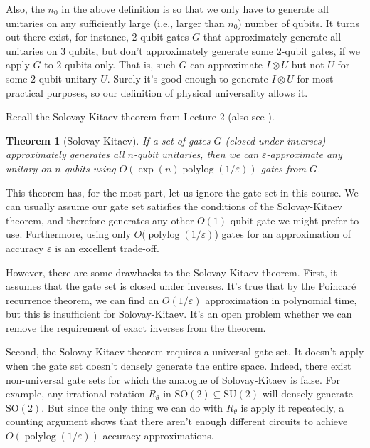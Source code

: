 \documentclass[11pt]{report}
\theoremstyle{plain}
\newtheorem{theorem}{Theorem}[section]
\theoremstyle{definition}
\newcommand{\eps}{\varepsilon}
\newcommand{\polylog}{\operatorname{polylog}}
\begin{document}
Also, the $n_0$ in the above definition is so that we only have to generate all unitaries on any sufficiently large (i.e., larger than $n_0$) number of qubits. It turns out there exist, for instance, $2$-qubit gates $G$ that approximately generate all unitaries on $3$ qubits, but don't approximately generate some $2$-qubit gates, if we apply $G$ to $2$ qubits only. That is, such $G$ can approximate $I \otimes U$ but not $U$ for some $2$-qubit unitary $U$. Surely it's good enough to generate $I \otimes U$ for most practical purposes, so our definition of physical universality allows it.

Recall the Solovay-Kitaev theorem from Lecture 2 (also see \cite{solovaykitaev}).

\begin{theorem}[Solovay-Kitaev]
If a set of gates $G$ (closed under inverses) approximately generates all $n$-qubit unitaries, then we can $\eps$-approximate any unitary on $n$ qubits using $O( \exp(n) \polylog(1/\eps))$ gates from $G$.
\end{theorem}

This theorem has, for the most part, let us ignore the gate set in this course. We can usually assume our gate set satisfies the conditions of the Solovay-Kitaev theorem, and therefore generates any other $O(1)$-qubit gate we might prefer to use. Furthermore, using only $O(\polylog(1/\eps)$) gates for an approximation of accuracy $\eps$ is an excellent trade-off.

However, there are some drawbacks to the Solovay-Kitaev theorem. First, it assumes that the gate set is closed under inverses.  It's true that by the Poincar\'{e} recurrence theorem, we can find an $O(1/\eps)$ approximation in polynomial time, but this is insufficient for Solovay-Kitaev.  It's an open problem whether we can remove the requirement of exact inverses from the theorem.

Second, the Solovay-Kitaev theorem requires a universal gate set. It doesn't apply when the gate set doesn't densely generate the entire space. Indeed, there exist non-universal gate sets for which the analogue of Solovay-Kitaev is false. For example, any irrational rotation $R_\theta$ in $\mathrm{SO}(2) \subseteq \mathrm{SU}(2)$ will densely generate $\mathrm{SO}(2)$. But since the only thing we can do with $R_\theta$ is apply it repeatedly, a counting argument shows that there aren't enough different circuits to achieve $O(\polylog(1/\eps))$ accuracy approximations.
\end{document}
